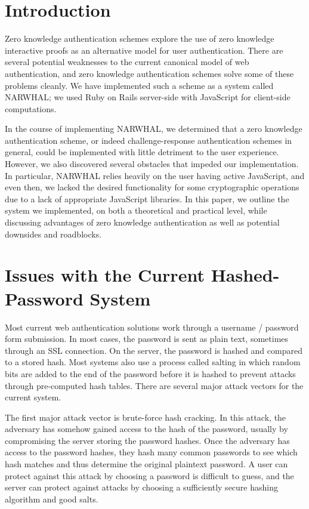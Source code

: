 \documentclass[11pt]{article}
\begin{document}
\section{Introduction}

Zero knowledge authentication schemes explore the use of zero knowledge interactive proofs as an alternative model for user authentication.  There are several potential weaknesses to the current canonical model of web authentication, and zero knowledge authentication schemes solve some of these problems cleanly.  We have implemented such a scheme as a system called NARWHAL; we used Ruby on Rails server-side with JavaScript for client-side computations.

In the course of implementing NARWHAL, we determined that a zero knowledge authentication scheme, or indeed challenge-response authentication schemes in general, could be implemented with little detriment to the user experience.  However, we also discovered several obstacles that impeded our implementation.  In particular, NARWHAL relies heavily on the user having active JavaScript, and even then, we lacked the desired functionality for some cryptographic operations due to a lack of appropriate JavaScript libraries.  In this paper, we outline the system we implemented, on both a theoretical and practical level, while discussing advantages of zero knowledge authentication as well as potential downsides and roadblocks.


\section{Issues with the Current Hashed-Password System}

Most current web authentication solutions work through a username / password form submission.  In most cases, the password is sent as plain text, sometimes through an SSL connection.  On the server, the password is hashed and compared to a stored hash.  Most systems also use a process called salting in which random bits are added to the end of the password before it is hashed to prevent attacks through pre-computed hash tables\cite{Zhou}.  There are several major attack vectors for the current system.

The first major attack vector is brute-force hash cracking\cite{Lum}.  In this attack, the adversary has somehow gained access to the hash of the password, usually by compromising the server storing the password hashes.  Once the adversary has access to the password hashes, they hash many common passwords to see which hash matches and thus determine the original plaintext password.  A user can protect against this attack by choosing a password is difficult to guess, and the server can protect against attacks by choosing a sufficiently secure hashing algorithm and good salts.
\end{document}
